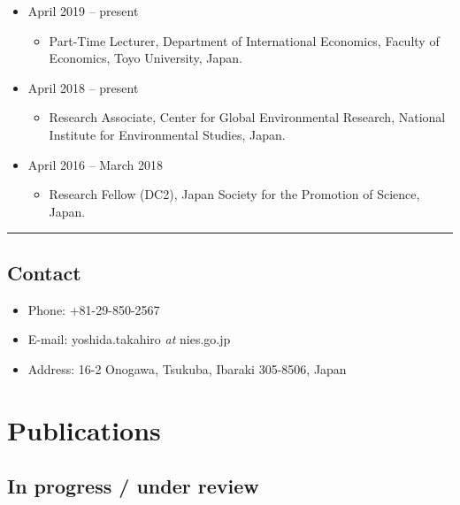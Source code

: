 \documentclass[]{book}
\providecommand{\tightlist}{%
  \setlength{\itemsep}{0pt}\setlength{\parskip}{0pt}}
\begin{document}
\begin{itemize}
\tightlist
\item
  April 2019 -- present

  \begin{itemize}
  \tightlist
  \item
    Part-Time Lecturer, Department of International Economics, Faculty of Economics, Toyo University, Japan.
  \end{itemize}
\item
  April 2018 -- present

  \begin{itemize}
  \tightlist
  \item
    Research Associate, Center for Global Environmental Research,
    National Institute for Environmental Studies, Japan.
  \end{itemize}
\item
  April 2016 -- March 2018

  \begin{itemize}
  \tightlist
  \item
    Research Fellow (DC2), Japan Society for the Promotion of Science, Japan.
  \end{itemize}
\end{itemize}

\begin{center}\rule{0.5\linewidth}{\linethickness}\end{center}

\hypertarget{contact}{%
\section*{Contact}\label{contact}}

\begin{itemize}
\tightlist
\item
  Phone: +81-29-850-2567
\item
  E-mail: yoshida.takahiro \emph{at} nies.go.jp
\item
  Address: 16-2 Onogawa, Tsukuba, Ibaraki 305-8506, Japan
\end{itemize}

\hypertarget{publications}{%
\chapter*{Publications}\label{publications}}

\hypertarget{in-progress-under-review}{%
\section*{In progress / under review}\label{in-progress-under-review}}
\end{document}
